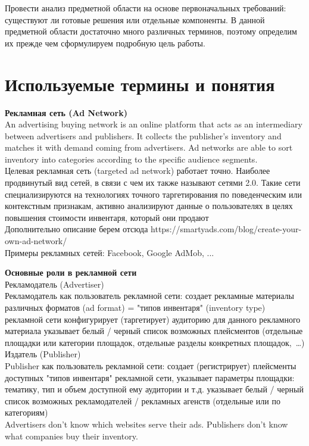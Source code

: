 \documentclass[specification,annotation,times]{itmo-student-thesis}
\begin{document}
Провести анализ предметной области на основе первоначальных требований: существуют ли готовые решения или отдельные компоненты.
В данной предметной области достаточно много различных терминов, поэтому 
определим их прежде чем сформулируем подробную цель работы.

\section{Используемые термины и понятия}\label{sec:terms}


\textbf{Рекламная сеть (Ad Network)}
\\
An advertising buying network is an online platform that acts as an intermediary between advertisers and publishers. It collects the publisher's inventory and matches it with demand coming from advertisers. Ad networks are able to sort inventory into categories according to the specific audience segments.
\\
Целевая рекламная сеть (targeted ad network) работает точно. Наиболее продвинутый вид сетей, в связи с чем их также называют сетями 2.0. Такие сети специализируются на технологиях точного таргетирования по поведенческим или контекстным признакам, активно анализируют данные о пользователях в целях повышения стоимости инвентаря, который они продают
\\
Дополнительно описание берем отсюда https://smartyads.com/blog/create-your-own-ad-network/
\\
Примеры рекламных сетей: Facebook, Google AdMob, ...


\textbf{Основные роли в рекламной сети}
\\
Рекламодатель (Advertiser)
\\
Рекламодатель как пользователь рекламной сети:
создает рекламные материалы различных форматов (ad format) = "типов инвентаря" (inventory type) рекламной сети
конфигурирует (таргетирует) аудиторию для данного рекламного материала
указывает белый / черный список возможных плейсментов (отдельные площадки или категории площадок, отдельные разделы конкретных площадок, …)
\\
Издатель (Publisher)
\\
Publisher как пользователь рекламной сети:
создает (регистрирует) плейсменты доступных "типов инвентаря" рекламной сети, указывает параметры площадки: тематику, тип и объем доступной ему аудитории и т.д.
указывает белый / черный список возможных рекламодателей / рекламных агенств (отдельные или по категориям)
\\
Advertisers don't know which websites serve their ads. Publishers don't know what companies buy their inventory.
\end{document}
